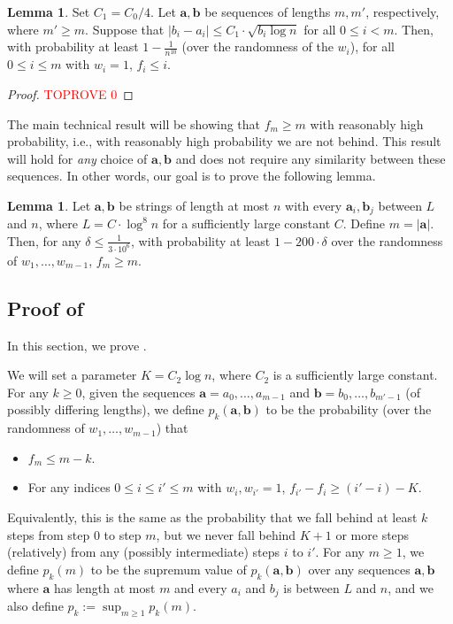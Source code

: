 \documentclass[12pt]{article}
\theoremstyle{definition}
\newtheorem{lemma}[theorem]{Lemma}
\theoremstyle{remark}
\newcommand{\ba}{\mathbf a}
\newcommand{\bb}{\mathbf b}
\begin{document}
\begin{lemma} \label{lem:not-ahead}
    Set $C_1 = C_0/4$. Let $\ba, \bb$ be sequences of lengths $m, m'$, respectively, where $m' \ge m$.
    Suppose that $|b_{i}-a_{i}| \le C_1 \cdot \sqrt{b_{i} \log n}$ for all $0 \le i < m$. Then, with probability at least $1 - \frac{1}{n^{10}}$ (over the randomness of the $w_i$), for all $0 \le i \le m$ with $w_i = 1$, $f_i \le i$.
\end{lemma}

\begin{proof}\textcolor{red}{TOPROVE 0}\end{proof}

The main technical result will be showing that $f_m \ge m$ with reasonably high probability, i.e., with reasonably high probability we are not behind. This result will hold for \emph{any} choice of $\ba, \bb$ and does not require any similarity between these sequences. In other words, our goal is to prove the following lemma.

\begin{lemma} \label{lem:main-technical}
    Let $\ba, \bb$ be strings of length at most $n$ with every $\ba_i, \bb_j$ between $L$ and $n$, where $L = C \cdot \log^8 n$ for a sufficiently large constant $C$. Define $m = |\ba|$.
    Then, for any $\delta \le \frac{1}{3 \cdot 10^6}$, with probability at least $1-200 \cdot \delta$ over the randomness of $w_1, \dots, w_{m-1}$, $f_m \ge m$.
\end{lemma}

\subsection{Proof of }\label{sec:main-technical}

In this section, we prove .

We will set a parameter $K = C_2 \log n$, where $C_2$ is a sufficiently large constant.
For any $k \ge 0$, given the sequences $\ba = a_0, \dots, a_{m-1}$ and $\bb = b_0, \dots, b_{m'-1}$ (of possibly differing lengths), we define $p_k(\ba, \bb)$ to be the probability (over the randomness of $w_1, \dots, w_{m-1}$) that
\begin{itemize}
    \item $f_m \le m-k$.
    \item For any indices $0 \le i \le i' \le m$ with $w_i, w_{i'} = 1$, $f_{i'}-f_i \ge (i'-i)-K$.
\end{itemize}
Equivalently, this is the same as the probability that we fall behind at least $k$ steps from step $0$ to step $m$, but we never fall behind $K+1$ or more steps (relatively) from any (possibly intermediate) steps $i$ to $i'$.
For any $m \ge 1$, we define $p_k(m)$ to be the supremum value of $p_k(\ba, \bb)$ over any sequences $\ba, \bb$ where $\ba$ has length at most $m$ and every $a_i$ and $b_j$ is between $L$ and $n$, and we also define $p_k := \sup_{m \ge 1} p_k(m)$.
\end{document}
